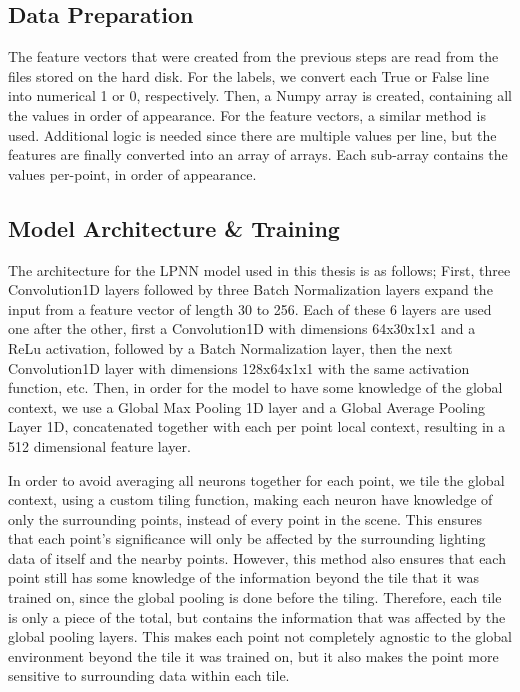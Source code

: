 \subsection{Data Preparation}
The feature vectors that were created from the previous steps are read from the files stored on the hard disk. For the labels, we convert each True or False line into numerical 1 or 0, respectively. Then, a Numpy array is created, containing all the values in order of appearance.
For the feature vectors, a similar method is used. Additional logic is needed since there are multiple values per line, but the features are finally converted into an array of arrays. Each sub-array contains the values per-point, in order of appearance.

\subsection{Model Architecture \& Training}

The architecture for the LPNN model used in this thesis is as follows; First, three Convolution1D layers followed by three Batch Normalization layers expand the input from a feature vector of length 30 to 256. Each of these 6 layers are used one after the other, first a Convolution1D with dimensions 64x30x1x1 and a ReLu activation, followed by a Batch Normalization layer, then the next Convolution1D layer with dimensions 128x64x1x1 with the same activation function, etc. Then, in order for the model to have some knowledge of the global context, we use a Global Max Pooling 1D layer and a Global Average Pooling Layer 1D, concatenated together with each per point local context, resulting in a 512 dimensional feature layer. 

In order to avoid averaging all neurons together for each point, we tile the global context, using a custom tiling function, making each neuron have knowledge of only the surrounding points, instead of every point in the scene. This ensures that each point's significance will only be affected by the surrounding lighting data of itself and the nearby points. However, this method also ensures that each point still has some knowledge of the information beyond the tile that it was trained on, since the global pooling is done before the tiling. Therefore, each tile is only a piece of the total, but contains the information that was affected by the global pooling layers. This makes each point not completely agnostic to the global environment beyond the tile it was trained on, but it also makes the point more sensitive to surrounding data within each tile.

